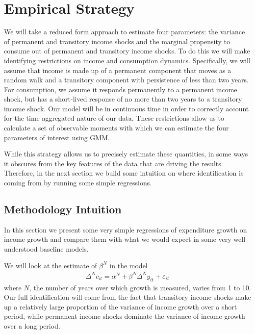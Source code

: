 \documentclass[titlepage]{\econtex}\newcommand{\texname}{ConsumptionHeterogeneity}
\begin{document}
\section{Empirical Strategy} \label{empirical_strategy} 
We will take a reduced form approach to estimate four parameters: the variance of permanent and transitory income shocks and the marginal propensity to consume out of permanent and transitory income shocks. To do this we will make identifying restrictions on income and consumption dynamics. Specifically, we will assume that income is made up of a permanent component that moves as a random walk and a transitory component with persistence of less than two years. For consumption, we assume it responds permanently to a permanent income shock, but has a short-lived response of no more than two years to a transitory income shock. Our model will be in continuous time in order to correctly account for the time aggregated nature of our data. These restrictions allow us to calculate a set of observable moments with which we can estimate the four parameters of interest using GMM.

 While this strategy allows us to precisely estimate these quantities, in some ways it obscures from the key features of the data that are driving the results. Therefore, in the next section we build some intuition on where identification is coming from by running some simple regressions.

\subsection{Methodology Intuition}
In this section we present some very simple regressions of expenditure growth on income growth and compare them with what we would expect in some very well understood baseline models.

We will look at the estimate of $\beta^N$ in the model
\begin{align*}
    \Delta^N c_{it} = \alpha^N + \beta^N \Delta^N y_{it} + \varepsilon_{it}
\end{align*}
where $N$, the number of years over which growth is measured, varies from 1 to 10. Our full identification will come from the fact that transitory income shocks make up a relatively large proportion of the variance of income growth over a short period, while permanent income shocks dominate the variance of income growth over a long period.
\end{document}
